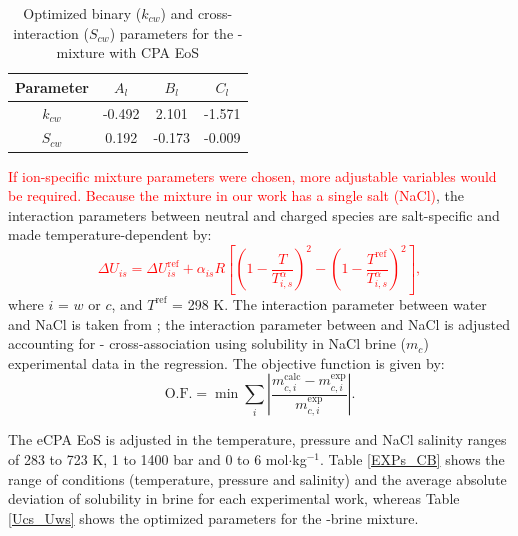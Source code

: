 \begin{table}[]
\caption{Optimized binary ($k_{cw}$) and cross-interaction ($S_{cw}$) parameters for the - mixture with CPA EoS}
\centering
\begin{tabular}{cccc}
\hline
\hline
 \textbf{Parameter} & $A_l$ & $B_l$ & $C_l$\\ 
 \hline
$k_{cw}$ & -0.492 & 2.101 & -1.571 \\
$S_{cw}$ & 0.192 & -0.173 & -0.009 \\
 \hline
 \hline
\end{tabular}
\label{Kij_Sij}
\end{table}

\textcolor{red}{If ion-specific mixture parameters were chosen, more adjustable variables would be required. Because the mixture in our work has a single salt (NaCl)}, the interaction parameters between neutral and charged species are salt-specific and made temperature-dependent by:
\textcolor{red}{
\begin{equation}
    \Delta U_{is} = \Delta U^\text{ref}_{is} + \alpha_{is}R \left [ \left ( 1-\frac{T}{T^\alpha_{i,s}} \right )^2 -\left ( 1-\frac{T^\text{ref}}{T^\alpha_{i,s}} \right )^2 \right ],
    \label{Eq:DUij}
\end{equation}
}
where $i$ = $w$ or $c$, and $T^\text{ref}$ = 298 K. The interaction parameter between water and NaCl is taken from \citeauthor{Maribo2015} \cite{Maribo2015}; the interaction parameter between  and NaCl is adjusted accounting for - cross-association using  solubility in NaCl brine ($m_c$) experimental data in the regression. The objective function is given by: 
\begin{equation}
    \text{O.F.} = \min  \sum_i \left |\frac{ m_{c,i}^{\text{calc}}-m_{c,i}^{\text{exp}}}{ m_{c,i}^{\text{exp}}} \right |.
    \label{Eq:OF2}
\end{equation}

The eCPA EoS is adjusted in the temperature, pressure and NaCl salinity ranges of 283 to 723 K, 1 to 1400 bar and 0 to 6 mol$\cdot$kg$^{-1}$. Table \ref{EXPs_CB} shows the range of conditions (temperature, pressure and salinity) and the average absolute deviation of  solubility in brine for each experimental work, whereas Table \ref{Ucs_Uws} shows the optimized parameters for the -brine mixture.


